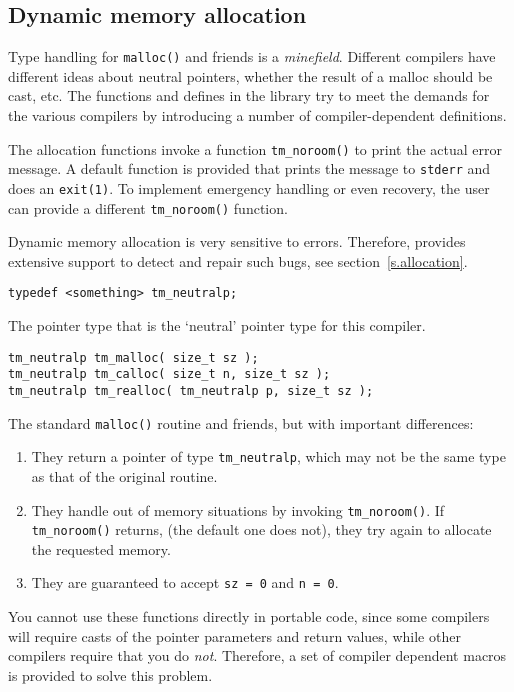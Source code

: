 \subsection{Dynamic memory allocation}
\label{s.malloc}
Type handling for \verb+malloc()+ and friends is a \emph{minefield}.
Different compilers have different ideas about neutral pointers, whether the
result of a malloc should be cast, etc.
The functions and defines in the {\Tm} {\C} library try to meet the demands
for the various compilers by introducing a number of 
compiler-dependent definitions.
\par
The allocation functions invoke a function \verb+tm_noroom()+ to print
the actual error message.
A default function is provided that prints the message to \verb+stderr+
and does an \verb+exit(1)+.
To implement emergency handling or even recovery,
the user can provide a different \verb+tm_noroom()+ function.
\par
Dynamic memory allocation is very sensitive to errors.
Therefore,
{\Tm} provides extensive support to detect and repair such bugs,
see section~\ref{s.allocation}.
\begin{verbatim}
typedef <something> tm_neutralp;
\end{verbatim}
\begin{desc}
The pointer type that is the `neutral' pointer type for this compiler.
\end{desc}
\begin{verbatim}
tm_neutralp tm_malloc( size_t sz );
tm_neutralp tm_calloc( size_t n, size_t sz );
tm_neutralp tm_realloc( tm_neutralp p, size_t sz );
\end{verbatim}
\begin{desc}
The standard \verb+malloc()+ routine and friends,
but with important differences:
\begin{enumerate}
\item They return a pointer of type \verb+tm_neutralp+, which may not
      be the same type as that of the original routine.
\item They handle out of memory situations by invoking \verb+tm_noroom()+.
      If \verb'tm_noroom()' returns, (the default one does not),
      they try again to allocate the requested memory.
\item They are guaranteed to accept \verb'sz = 0' and \verb'n = 0'.
\end{enumerate}
You cannot use these functions directly in portable code, since some
compilers will require casts of the pointer parameters and return values,
while other compilers require that you do \emph{not}.  Therefore, a set
of compiler dependent macros is provided to solve this problem.
\end{desc}
